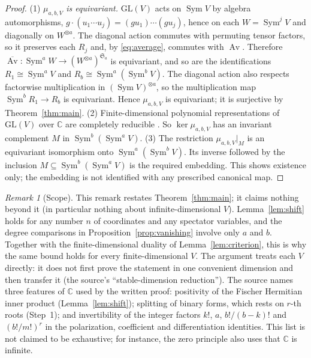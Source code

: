\documentclass[11pt]{article}
\theoremstyle{remark}
\newtheorem{remark}[theorem]{Remark}
\DeclareMathOperator{\Sym}{Sym}
\DeclareMathOperator{\Av}{Av}
\newcommand{\C}{\mathbb C}
\newcommand{\Sa}{\mathfrak S_a}
\begin{document}
\begin{proof}
(1) \emph{$\mu_{a,b,V}$ is equivariant.} $\mathrm{GL}(V)$ acts on $\Sym V$
by algebra automorphisms, $g\cdot(u_1\cdots u_j)=(gu_1)\cdots(gu_j)$, hence
on each $W=\Sym^jV$ and diagonally on $W^{\otimes a}$. The diagonal action
commutes with permuting tensor factors, so it preserves each $R_j$ and, by
\eqref{eq:average}, commutes with $\Av$. Therefore
$\overline{\Av}\colon\Sym^aW\to(W^{\otimes a})^{\Sa}$ is equivariant, and
so are the identifications $R_1\cong\Sym^aV$ and
$R_b\cong\Sym^a(\Sym^bV)$. The diagonal action also respects factorwise
multiplication in $(\Sym V)^{\otimes a}$, so the multiplication map
$\Sym^bR_1\to R_b$ is equivariant. Hence $\mu_{a,b,V}$ is equivariant; it
is surjective by Theorem~\ref{thm:main}.
(2) Finite-dimensional polynomial representations of $\mathrm{GL}(V)$ over
$\C$ are completely reducible
\cite[Chapter~I, Appendix~A, Sections~7--8]{Macdonald}. So
$\ker\mu_{a,b,V}$ has an invariant complement $M$ in $\Sym^b(\Sym^aV)$.
(3) The restriction $\mu_{a,b,V}|_M$ is an equivariant isomorphism onto
$\Sym^a(\Sym^b V)$. Its inverse followed by the inclusion
$M\subseteq\Sym^b(\Sym^a V)$ is the required embedding.
This shows existence only; the embedding is not identified with any
prescribed canonical map.
\end{proof}

\begin{remark}[Scope]\label{rem:scope}
This remark restates Theorem~\ref{thm:main}; it claims nothing beyond it
(in particular nothing about infinite-dimensional $V$).
Lemma~\ref{lem:shift} holds for any number $n$ of coordinates and any
spectator variables, and the degree comparisons in
Proposition~\ref{prop:vanishing} involve only $a$ and $b$. Together with
the finite-dimensional duality of Lemma~\ref{lem:criterion}, this is why the
same bound holds for every finite-dimensional $V$. The argument treats each
$V$ directly: it does not first prove the statement in one convenient
dimension and then transfer it (the source's ``stable-dimension
reduction''). The source names three features of $\C$ used by the written
proof: positivity of the Fischer Hermitian inner product
(Lemma~\ref{lem:shift}); splitting of binary forms, which rests on $r$-th
roots (Step~1); and invertibility of the integer factors $k!$, $a$,
$b!/(b-k)!$ and $(b!/m!)^r$ in the polarization, coefficient and
differentiation identities. This list is not claimed to be exhaustive; for
instance, the zero principle also uses that $\C$ is infinite.
\end{remark}
\end{document}
